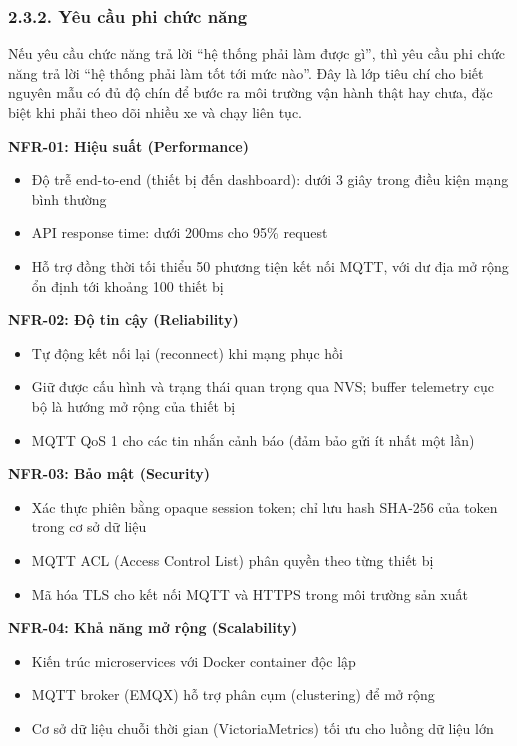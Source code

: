 \documentclass[a4paper]{extarticle}
\providecommand{\tightlist}{%
  \setlength{\itemsep}{0pt}\setlength{\parskip}{0pt}}
\begin{document}
\subsubsection{2.3.2. Yêu cầu phi chức
năng}\label{232-yuxeau-cux1ea7u-phi-chux1ee9c-nux103ng}

Nếu yêu cầu chức năng trả lời ``hệ thống phải làm được gì'', thì yêu cầu
phi chức năng trả lời ``hệ thống phải làm tốt tới mức nào''. Đây là lớp
tiêu chí cho biết nguyên mẫu có đủ độ chín để bước ra môi trường vận
hành thật hay chưa, đặc biệt khi phải theo dõi nhiều xe và chạy liên
tục.

\textbf{NFR-01: Hiệu suất (Performance)}

\begin{itemize}
\tightlist
\item
  Độ trễ end-to-end (thiết bị đến dashboard): dưới 3 giây trong điều
  kiện mạng bình thường
\item
  API response time: dưới 200ms cho 95\% request
\item
  Hỗ trợ đồng thời tối thiểu 50 phương tiện kết nối MQTT, với dư địa mở
  rộng ổn định tới khoảng 100 thiết bị
\end{itemize}

\textbf{NFR-02: Độ tin cậy (Reliability)}

\begin{itemize}
\tightlist
\item
  Tự động kết nối lại (reconnect) khi mạng phục hồi
\item
  Giữ được cấu hình và trạng thái quan trọng qua NVS; buffer telemetry
  cục bộ là hướng mở rộng của thiết bị
\item
  MQTT QoS 1 cho các tin nhắn cảnh báo (đảm bảo gửi ít nhất một lần)
\end{itemize}

\textbf{NFR-03: Bảo mật (Security)}

\begin{itemize}
\tightlist
\item
  Xác thực phiên bằng opaque session token; chỉ lưu hash SHA-256 của
  token trong cơ sở dữ liệu
\item
  MQTT ACL (Access Control List) phân quyền theo từng thiết bị
\item
  Mã hóa TLS cho kết nối MQTT và HTTPS trong môi trường sản xuất
\end{itemize}

\textbf{NFR-04: Khả năng mở rộng (Scalability)}

\begin{itemize}
\tightlist
\item
  Kiến trúc microservices với Docker container độc lập
\item
  MQTT broker (EMQX) hỗ trợ phân cụm (clustering) để mở rộng
\item
  Cơ sở dữ liệu chuỗi thời gian (VictoriaMetrics) tối ưu cho luồng dữ
  liệu lớn
\end{itemize}
\end{document}
